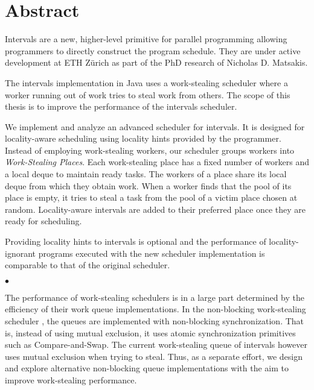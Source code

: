 
\chapter*{Abstract}
\label{chap:abstract}

Intervals are a new, higher-level primitive for parallel programming
allowing programmers to directly construct the program schedule. They
are under active development at ETH Zürich as part of the PhD research
of Nicholas D. Matsakis.

The intervals implementation in Java uses a work-stealing scheduler
where a worker running out of work tries to steal work from
others. The scope of this thesis is to improve the performance of the
intervals scheduler.

We implement and analyze an advanced scheduler for intervals. It is
designed for locality-aware scheduling using locality hints provided
by the programmer. Instead of employing work-stealing workers, our
scheduler groups workers into \emph{Work-Stealing Places}. Each
work-stealing place has a fixed number of workers and a local deque to
maintain ready tasks. The workers of a place share its local deque
from which they obtain work. When a worker finds that the pool of its
place is empty, it tries to steal a task from the pool of a victim
place chosen at random. Locality-aware intervals are added to their
preferred place once they are ready for scheduling. 

Providing locality hints to intervals is optional and the performance
of locality-ignorant programs executed with the new scheduler
implementation is comparable to that of the original scheduler.

\begin{center}
  $\bullet$
\end{center}

The performance of work-stealing schedulers is in a large part
determined by the efficiency of their work queue implementations. In
the non-blocking work-stealing scheduler \cite{Arora1998}, the queues
are implemented with non-blocking synchronization. That is, instead of
using mutual exclusion, it uses atomic synchronization primitives such
as Compare-and-Swap. The current work-stealing queue of intervals
however uses mutual exclusion when trying to steal. Thus, as a
separate effort, we design and explore alternative non-blocking queue
implementations with the aim to improve work-stealing performance.


